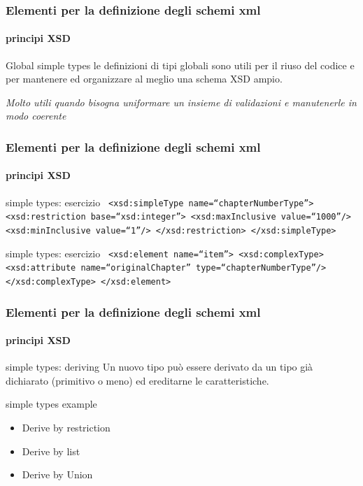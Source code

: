 \begin{frame}
	\frametitle{Elementi per la definizione degli schemi xml}
	\framesubtitle{principi XSD}
	\addtocounter{nframe}{1}

	\begin{block}{Global simple types}
		le definizioni di tipi globali sono utili per il riuso del codice e per mantenere ed organizzare al meglio una schema XSD ampio.
	\end{block}

	\textit{Molto utili quando bisogna uniformare un insieme di validazioni e manutenerle in modo coerente}

\end{frame}


\begin{frame}
	\frametitle{Elementi per la definizione degli schemi xml}
	\framesubtitle{principi XSD}
	\addtocounter{nframe}{1}

	\begin{block}{simple types: esercizio}
		\texttt{
			<xsd:simpleType name=``chapterNumberType''>
			<xsd:restriction base=``xsd:integer''>
			<xsd:maxInclusive value=``1000''/>
			<xsd:minInclusive value=``1''/>
			</xsd:restriction>
			</xsd:simpleType>
		}
	\end{block}

	\begin{block}{simple types: esercizio}
		\texttt{
			<xsd:element name=``item''>
			<xsd:complexType>
			<xsd:attribute name=``originalChapter'' type=``chapterNumberType''/>
			</xsd:complexType>
			</xsd:element>
		}
	\end{block}
\end{frame}



\begin{frame}
	\frametitle{Elementi per la definizione degli schemi xml}
	\framesubtitle{principi XSD}
	\addtocounter{nframe}{1}

	\begin{block}{simple types: deriving}
		Un nuovo tipo può essere derivato da un tipo già dichiarato (primitivo o meno) ed ereditarne le caratteristiche.
	\end{block}

	\begin{block}{simple types example}
		\begin{itemize}
			\item Derive by restriction
			\item Derive by list
			\item Derive by Union
		\end{itemize}
	\end{block}

\end{frame}

